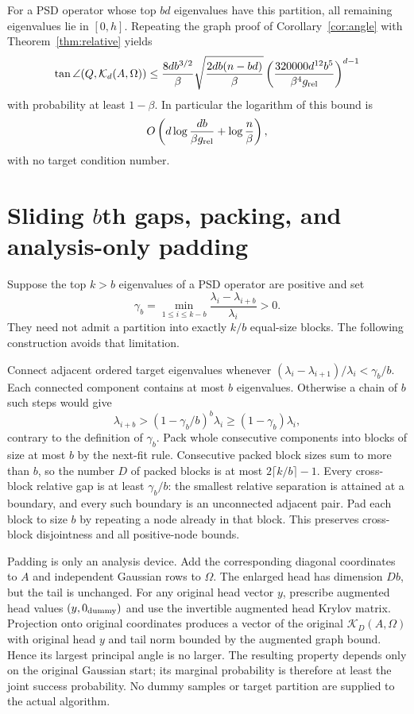 \documentclass[11pt]{article}
\newcommand{\K}{\mathcal K}
\begin{document}
For a PSD operator whose top $bd$ eigenvalues have this partition,
all remaining eigenvalues lie in $[0,h]$. Repeating the graph proof of
Corollary~\ref{cor:angle} with Theorem~\ref{thm:relative} yields
\begin{equation}\label{eq:relative-angle}
 \tan\angle(Q,\K_d(A,\Omega))
 \leq\frac{8db^{3/2}}\beta
       \sqrt{\frac{2db(n-bd)}\beta}
       \left(\frac{320000d^{12}b^5}{\beta^4g_{\rm rel}}\right)^{d-1}
\end{equation}
with probability at least $1-\beta$. In particular the logarithm of
this bound is
\[
 O\left(d\log\frac{db}{\beta g_{\rm rel}}+\log\frac n\beta\right),
\]
with no target condition number.

\section{Sliding \texorpdfstring{$b$}{b}th gaps, packing, and analysis-only padding}
Suppose the top $k>b$ eigenvalues of a PSD operator are positive and set
\[
 \gamma_b=\min_{1\leq i\leq k-b}
                  \frac{\lambda_i-\lambda_{i+b}}{\lambda_i}>0.
\]
They need not admit a partition into exactly $k/b$ equal-size blocks.
The following construction avoids that limitation.

Connect adjacent ordered target eigenvalues whenever
$(\lambda_i-\lambda_{i+1})/\lambda_i<\gamma_b/b$.
Each connected component contains at most $b$ eigenvalues. Otherwise
a chain of $b$ such steps would give
\[
 \lambda_{i+b}>(1-\gamma_b/b)^b\lambda_i
                       \geq(1-\gamma_b)\lambda_i,
\]
contrary to the definition of $\gamma_b$.
Pack whole consecutive components into blocks of size at most $b$ by
the next-fit rule. Consecutive packed block sizes sum to more than $b$,
so the number $D$ of packed blocks is at most
$2\lceil k/b\rceil-1$. Every cross-block relative gap is at least
$\gamma_b/b$: the smallest relative separation is attained at a
boundary, and every such boundary is an unconnected adjacent pair.
Pad each block to size $b$ by repeating a node already in that block.
This preserves cross-block disjointness and all positive-node bounds.

Padding is only an analysis device. Add the corresponding diagonal
coordinates to $A$ and independent Gaussian rows to $\Omega$.
The enlarged head has dimension $Db$, but the tail is unchanged.
For any original head vector $y$, prescribe augmented head values
$(y,0_{\rm dummy})$ and use the invertible augmented head Krylov matrix.
Projection onto original coordinates produces a vector of the original
$\K_D(A,\Omega)$ with original head $y$ and tail norm bounded by the
augmented graph bound. Hence its largest principal angle is no larger.
The resulting property depends only on the original Gaussian start;
its marginal probability is therefore at least the joint success
probability. No dummy samples or target partition are supplied to the
actual algorithm.
\end{document}
